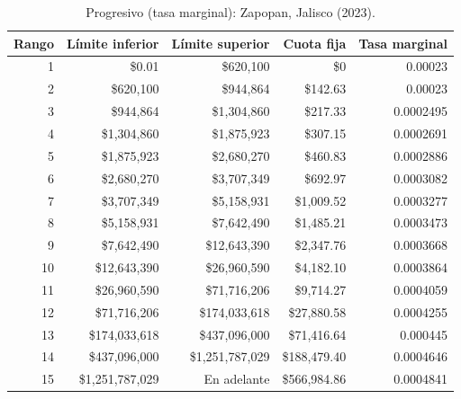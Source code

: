 \begin{table}[htbp]
\centering
\small
\begin{tabular}{rrrrr}
\toprule
Rango & Límite inferior & Límite superior & Cuota fija & Tasa marginal \\
\midrule
1 & \$0.01 & \$620{,}100 & \$0 & 0.00023 \\
2 & \$620{,}100 & \$944{,}864 & \$142.63 & 0.00023 \\
3 & \$944{,}864 & \$1{,}304{,}860 & \$217.33 & 0.0002495 \\
4 & \$1{,}304{,}860 & \$1{,}875{,}923 & \$307.15 & 0.0002691 \\
5 & \$1{,}875{,}923 & \$2{,}680{,}270 & \$460.83 & 0.0002886 \\
6 & \$2{,}680{,}270 & \$3{,}707{,}349 & \$692.97 & 0.0003082 \\
7 & \$3{,}707{,}349 & \$5{,}158{,}931 & \$1{,}009.52 & 0.0003277 \\
8 & \$5{,}158{,}931 & \$7{,}642{,}490 & \$1{,}485.21 & 0.0003473 \\
9 & \$7{,}642{,}490 & \$12{,}643{,}390 & \$2{,}347.76 & 0.0003668 \\
10 & \$12{,}643{,}390 & \$26{,}960{,}590 & \$4{,}182.10 & 0.0003864 \\
11 & \$26{,}960{,}590 & \$71{,}716{,}206 & \$9{,}714.27 & 0.0004059 \\
12 & \$71{,}716{,}206 & \$174{,}033{,}618 & \$27{,}880.58 & 0.0004255 \\
13 & \$174{,}033{,}618 & \$437{,}096{,}000 & \$71{,}416.64 & 0.000445 \\
14 & \$437{,}096{,}000 & \$1{,}251{,}787{,}029 & \$188{,}479.40 & 0.0004646 \\
15 & \$1{,}251{,}787{,}029 & En adelante & \$566{,}984.86 & 0.0004841 \\
\bottomrule
\end{tabular}
\caption{Progresivo (tasa marginal): Zapopan, Jalisco (2023).}
\label{tab:esquema-progresivo}

\end{table}
